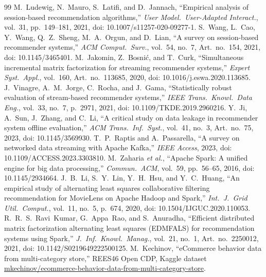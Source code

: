 \documentclass[10pt,journal]{IEEEtran}
\begin{document}
\begin{thebibliography}{99}
 M.~Ludewig, N.~Mauro, S.~Latifi, and D.~Jannach, ``Empirical analysis of session-based recommendation algorithms,'' \emph{User Model.\ User-Adapted Interact.}, vol.~31, pp.~149--181, 2021, doi: 10.1007/s11257-020-09277-1.
 S.~Wang, L.~Cao, Y.~Wang, Q.~Z.~Sheng, M.~A.~Orgun, and D.~Lian, ``A survey on session-based recommender systems,'' \emph{ACM Comput.\ Surv.}, vol.~54, no.~7, Art.~no.~154, 2021, doi: 10.1145/3465401.
 M.~Jakomin, Z.~Bosni\'c, and T.~Curk, ``Simultaneous incremental matrix factorization for streaming recommender systems,'' \emph{Expert Syst.\ Appl.}, vol.~160, Art.~no.~113685, 2020, doi: 10.1016/j.eswa.2020.113685.
 J.~Vinagre, A.~M.~Jorge, C.~Rocha, and J.~Gama, ``Statistically robust evaluation of stream-based recommender systems,'' \emph{IEEE Trans.\ Knowl.\ Data Eng.}, vol.~33, no.~7, p.~2971, 2021, doi: 10.1109/TKDE.2019.2960216.
 Y.~Ji, A.~Sun, J.~Zhang, and C.~Li, ``A critical study on data leakage in recommender system offline evaluation,'' \emph{ACM Trans.\ Inf.\ Syst.}, vol.~41, no.~3, Art.~no.~75, 2023, doi: 10.1145/3569930.
 T.~P.~Raptis and A.~Passarella, ``A survey on networked data streaming with Apache Kafka,'' \emph{IEEE Access}, 2023, doi: 10.1109/ACCESS.2023.3303810.
 M.~Zaharia \emph{et al.}, ``Apache Spark: A unified engine for big data processing,'' \emph{Commun.\ ACM}, vol.~59, pp.~56--65, 2016, doi: 10.1145/2934664.
 J.~B.~Li, S.~Y.~Lin, Y.~H.~Hsu, and Y.~C.~Huang, ``An empirical study of alternating least squares collaborative filtering recommendation for MovieLens on Apache Hadoop and Spark,'' \emph{Int.\ J.\ Grid Util.\ Comput.}, vol.~11, no.~5, p.~674, 2020, doi: 10.1504/IJGUC.2020.110053.
 R.~R.~S.~Ravi~Kumar, G.~Appa~Rao, and S.~Anuradha, ``Efficient distributed matrix factorization alternating least squares (EDMFALS) for recommendation systems using Spark,'' \emph{J.\ Inf.\ Knowl.\ Manag.}, vol.~21, no.~1, Art.~no.~2250012, 2021, doi: 10.1142/S0219649222500125.
 M.~Kechinov, ``eCommerce behavior data from multi-category store,'' REES46 Open CDP, Kaggle dataset \url{mkechinov/ecommerce-behavior-data-from-multi-category-store}.
\end{thebibliography}
\end{document}
